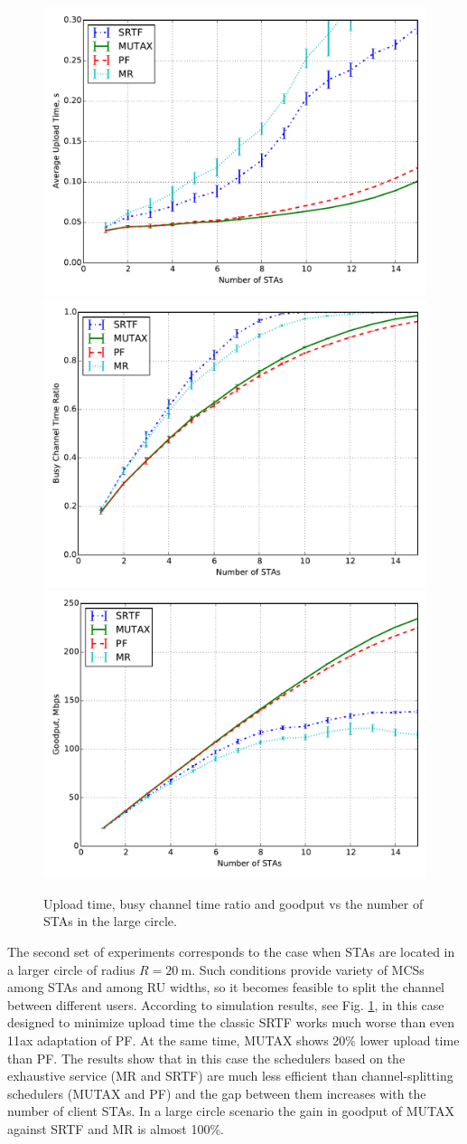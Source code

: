 \begin{figure}[!bt]
\centering
\includegraphics[width = 0.32\linewidth]{20-d.pdf}
\includegraphics[width = 0.32\linewidth]{20-e.pdf}
\includegraphics[width = 0.32\linewidth]{20-t.pdf}
%
\vspace{-0.5em}
\caption{\label{fig:25-e} Upload time, busy channel time ratio and goodput vs the number of STAs in the large circle.}
\vspace{-0.5em}
\end{figure}

The second set of experiments corresponds to the case when STAs are located in a larger circle of radius $R = \SI{20}{\m}$.
Such conditions provide variety of MCSs among STAs and among RU widths, so it becomes feasible to split the channel between different users.
According to simulation results, see Fig. \ref{fig:25-e}, in this case designed to minimize upload time the classic SRTF works much worse than even 11ax adaptation of PF. At the same time, MUTAX shows 20\% lower upload time than PF. The results show that in this case the schedulers based on the exhaustive service (MR and SRTF) are  much less efficient than channel-splitting schedulers (MUTAX and PF) and the gap between them increases with the number of client STAs. %
In a large circle scenario the gain in goodput of MUTAX against SRTF and MR is almost 100\%.



